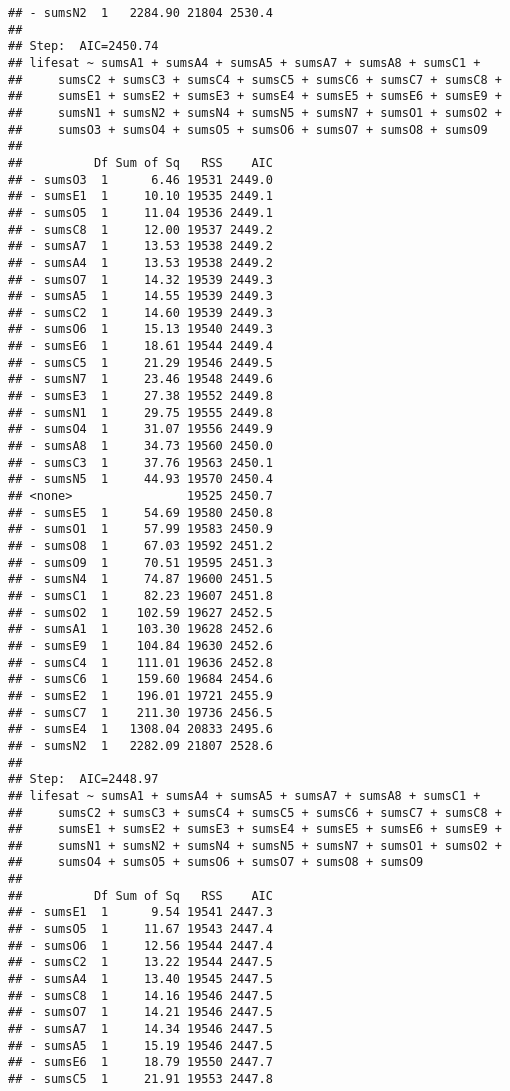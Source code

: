 \documentclass[,man,floatsintext]{apa6}
\begin{document}
\begin{verbatim}
## - sumsN2  1   2284.90 21804 2530.4
## 
## Step:  AIC=2450.74
## lifesat ~ sumsA1 + sumsA4 + sumsA5 + sumsA7 + sumsA8 + sumsC1 + 
##     sumsC2 + sumsC3 + sumsC4 + sumsC5 + sumsC6 + sumsC7 + sumsC8 + 
##     sumsE1 + sumsE2 + sumsE3 + sumsE4 + sumsE5 + sumsE6 + sumsE9 + 
##     sumsN1 + sumsN2 + sumsN4 + sumsN5 + sumsN7 + sumsO1 + sumsO2 + 
##     sumsO3 + sumsO4 + sumsO5 + sumsO6 + sumsO7 + sumsO8 + sumsO9
## 
##          Df Sum of Sq   RSS    AIC
## - sumsO3  1      6.46 19531 2449.0
## - sumsE1  1     10.10 19535 2449.1
## - sumsO5  1     11.04 19536 2449.1
## - sumsC8  1     12.00 19537 2449.2
## - sumsA7  1     13.53 19538 2449.2
## - sumsA4  1     13.53 19538 2449.2
## - sumsO7  1     14.32 19539 2449.3
## - sumsA5  1     14.55 19539 2449.3
## - sumsC2  1     14.60 19539 2449.3
## - sumsO6  1     15.13 19540 2449.3
## - sumsE6  1     18.61 19544 2449.4
## - sumsC5  1     21.29 19546 2449.5
## - sumsN7  1     23.46 19548 2449.6
## - sumsE3  1     27.38 19552 2449.8
## - sumsN1  1     29.75 19555 2449.8
## - sumsO4  1     31.07 19556 2449.9
## - sumsA8  1     34.73 19560 2450.0
## - sumsC3  1     37.76 19563 2450.1
## - sumsN5  1     44.93 19570 2450.4
## <none>                19525 2450.7
## - sumsE5  1     54.69 19580 2450.8
## - sumsO1  1     57.99 19583 2450.9
## - sumsO8  1     67.03 19592 2451.2
## - sumsO9  1     70.51 19595 2451.3
## - sumsN4  1     74.87 19600 2451.5
## - sumsC1  1     82.23 19607 2451.8
## - sumsO2  1    102.59 19627 2452.5
## - sumsA1  1    103.30 19628 2452.6
## - sumsE9  1    104.84 19630 2452.6
## - sumsC4  1    111.01 19636 2452.8
## - sumsC6  1    159.60 19684 2454.6
## - sumsE2  1    196.01 19721 2455.9
## - sumsC7  1    211.30 19736 2456.5
## - sumsE4  1   1308.04 20833 2495.6
## - sumsN2  1   2282.09 21807 2528.6
## 
## Step:  AIC=2448.97
## lifesat ~ sumsA1 + sumsA4 + sumsA5 + sumsA7 + sumsA8 + sumsC1 + 
##     sumsC2 + sumsC3 + sumsC4 + sumsC5 + sumsC6 + sumsC7 + sumsC8 + 
##     sumsE1 + sumsE2 + sumsE3 + sumsE4 + sumsE5 + sumsE6 + sumsE9 + 
##     sumsN1 + sumsN2 + sumsN4 + sumsN5 + sumsN7 + sumsO1 + sumsO2 + 
##     sumsO4 + sumsO5 + sumsO6 + sumsO7 + sumsO8 + sumsO9
## 
##          Df Sum of Sq   RSS    AIC
## - sumsE1  1      9.54 19541 2447.3
## - sumsO5  1     11.67 19543 2447.4
## - sumsO6  1     12.56 19544 2447.4
## - sumsC2  1     13.22 19544 2447.5
## - sumsA4  1     13.40 19545 2447.5
## - sumsC8  1     14.16 19546 2447.5
## - sumsO7  1     14.21 19546 2447.5
## - sumsA7  1     14.34 19546 2447.5
## - sumsA5  1     15.19 19546 2447.5
## - sumsE6  1     18.79 19550 2447.7
## - sumsC5  1     21.91 19553 2447.8

\end{verbatim}
\end{document}
